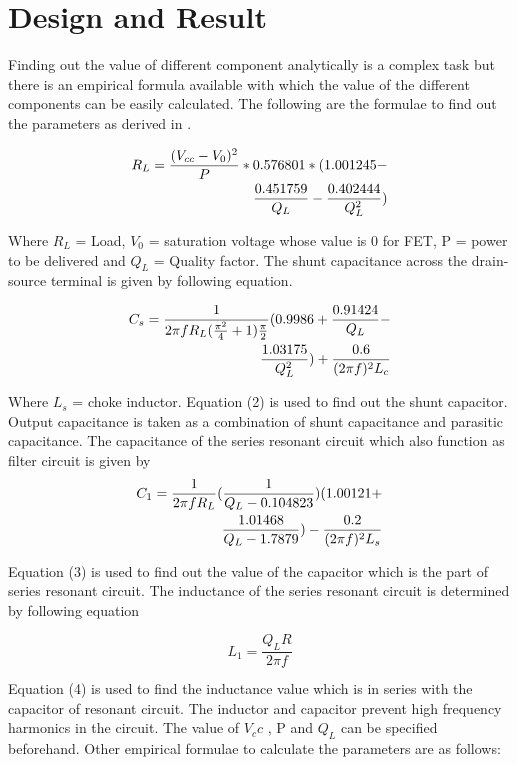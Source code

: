\documentclass[journal,twoside]{IEEEtran}
\begin{document}
\section{Design and Result}

Finding out the value of different component analytically is a
complex task but there is an empirical formula available with
which the value of the different components can be easily
calculated. The following are the formulae to find out the
parameters as derived in \cite{Sokal2001}.

\begin{align}
R_L= \frac{(V_{cc}-V_0)^
2}{P}*0.576801*(1.001245-\notag
\\ \qquad \frac{0.451759}{Q_L}-\frac{0.402444}{Q_L^2})
\end{align}

\bigskip

Where $R_L$ = Load, $V_0$ = saturation voltage whose value is 0
for FET, P = power to be delivered and $Q_L$ = Quality factor.
The shunt capacitance across the drain-source terminal is
given by following equation.

\begin{align}
C_s= \frac{1}{2\pi fR_L(\frac{\pi ^2}{4}+1)\frac{\pi}{2}}(0.9986+ \frac{0.91424}{Q_L}-\notag\\ \qquad\frac{1.03175}{Q_L^2}) +\frac{0.6}{(2\pi f)^2L_c}
\end{align}

\bigskip

Where $L_s$ = choke inductor. Equation (2) is used to find out
the shunt capacitor. Output capacitance is taken as a
combination of shunt capacitance and parasitic capacitance.
The capacitance of the series resonant circuit which also
function as filter circuit is given by
\begin{align}
C_1=\frac{1}{2\pi fR_L}(\frac{1}{Q_L-0.104823})(1.00121+\notag\\\qquad\qquad\frac{1.01468}{Q_L-1.7879})-\frac{0.2}{(2\pi f)^2L_s}
\end{align}


\bigskip
Equation (3) is used to find out the value of the capacitor
which is the part of series resonant circuit. The inductance of
the series resonant circuit is determined by following equation

\begin{equation}
L_1=\frac{Q_LR}{2\pi f}
\end{equation}

\bigskip
Equation (4) is used to find the inductance value which is in
series with the capacitor of resonant circuit. The inductor and
capacitor prevent high frequency harmonics in the circuit.
The value of $V_cc$ , P and $Q_L$ can be specified beforehand.
Other empirical formulae to calculate the parameters are as
follows:
\end{document}
